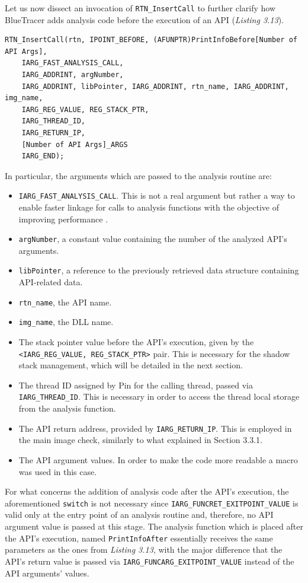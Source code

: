 Let us now dissect an invocation of \texttt{RTN\_InsertCall} to further clarify how BlueTracer adds analysis code before the execution of an API (\textit{Listing 3.13}).  
\begin{lstlisting}[caption={\texttt{RTN\_InsertCall} invocation to add analysis code before an API's execution},captionpos=b]
RTN_InsertCall(rtn, IPOINT_BEFORE, (AFUNPTR)PrintInfoBefore[Number of API Args],
 	IARG_FAST_ANALYSIS_CALL,
	IARG_ADDRINT, argNumber,
	IARG_ADDRINT, libPointer, IARG_ADDRINT, rtn_name, IARG_ADDRINT, img_name,
	IARG_REG_VALUE, REG_STACK_PTR,
	IARG_THREAD_ID,
	IARG_RETURN_IP,
	[Number of API Args]_ARGS
	IARG_END);
\end{lstlisting}

In particular, the arguments which are passed to the analysis routine are:
\begin{itemize}
\item \texttt{IARG\_FAST\_ANALYSIS\_CALL}. This is not a real argument but rather a way to enable faster linkage for calls to analysis functions with the objective of improving performance \cite{Pin}.
\item \texttt{argNumber}, a constant value containing the number of the analyzed API's arguments.
\item \texttt{libPointer}, a reference to the previously retrieved data structure containing API-related data.
\item \texttt{rtn\_name}, the API name.
\item \texttt{img\_name}, the DLL name.
\item The stack pointer value before the API's execution, given by the \texttt{<IARG\_REG\_VALUE, REG\_STACK\_PTR>} pair. This is necessary for the shadow stack management, which will be detailed in the next section.
\item The thread ID assigned by Pin for the calling thread, passed via \texttt{IARG\_THREAD\_ID}. This is necessary in order to access the thread local storage from the analysis function.
\item The API return address, provided by \texttt{IARG\_RETURN\_IP}. This is employed in the main image check, similarly to what explained in Section 3.3.1.
\item The API argument values. In order to make the code more readable a macro was used in this case.
\end{itemize}

For what concerns the addition of analysis code after the API's execution, the aforementioned \texttt{switch} is not necessary since \texttt{IARG\_FUNCRET\_EXITPOINT\_VALUE} is valid only at the entry point of an analysis routine and, therefore, no API argument value is passed at this stage. The analysis function which is placed after the API's execution, named \texttt{PrintInfoAfter} essentially receives the same parameters as the ones from \textit{Listing 3.13}, with the major difference that the API's return value is passed via \texttt{IARG\_FUNCARG\_EXITPOINT\_VALUE} instead of the API arguments' values.


